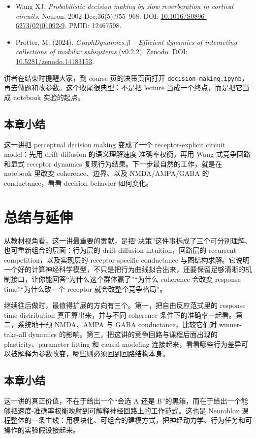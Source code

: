 \documentclass[a4paper]{article}
\begin{document}
\begin{itemize}
    \item Wang XJ. \emph{Probabilistic decision making by slow reverberation in cortical circuits}. Neuron. 2002 Dec;36(5):955--968. DOI: \href{https://doi.org/10.1016/S0896-6273(02)01092-9}{10.1016/S0896-6273(02)01092-9}. PMID: 12467598.
    \item Protter, M. (2024). \emph{GraphDynamics.jl -- Efficient dynamics of interacting collections of modular subsystems} (v0.2.2). Zenodo. DOI: \href{https://doi.org/10.5281/zenodo.14183153}{10.5281/zenodo.14183153}.
\end{itemize}

讲者在结束时提醒大家，到 course 页的决策页面打开 \texttt{decision\_making.ipynb}，再去做题和改参数。这个收尾很典型：不是把 lecture 当成一个终点，而是把它当成 notebook 实验的起点。

\subsection{本章小结}
这一讲把 perceptual decision making 变成了一个 receptor-explicit circuit model：先用 drift-diffusion 的语义理解速度-准确率权衡，再用 Wang 式竞争回路和显式 receptor dynamics 复现行为结果。下一步最自然的工作，就是在 notebook 里改变 coherence、边界、以及 NMDA/AMPA/GABA 的 conductance，看看 decision behavior 如何变化。

\section{总结与延伸}
从教材视角看，这一讲最重要的贡献，是把“决策”这件事拆成了三个可分别理解、也可重新组合的层面：行为层的 drift-diffusion intuition，回路层的 recurrent competition，以及实现层的 receptor-specific conductance 与图结构求解。它说明一个好的计算神经科学模型，不只是把行为曲线拟合出来，还要保留足够清晰的机制接口，让你能回答“为什么这个群体赢了”“为什么 coherence 会改变 response time”“为什么改一个 receptor 就会改整个竞争格局”。

继续往后做时，最值得扩展的方向有三个。第一，把自由反应范式里的 response time distribution 真正算出来，并与不同 coherence 条件下的准确率一起看。第二，系统地干预 NMDA、AMPA 与 GABA conductance，比较它们对 winner-take-all dynamics 的影响。第三，把这讲的竞争回路与课程后面出现的 plasticity、parameter fitting 和 causal modeling 连接起来，看看哪些行为差异可以被解释为参数改变，哪些则必须回到回路结构本身。

\subsection{本章小结}
这一讲的真正价值，不在于给出一个“会选 A 还是 B”的黑箱，而在于给出一个能够把速度-准确率权衡映射到可解释神经回路上的工作范式。这也是 Neuroblox 课程整体的一条主线：用模块化、可组合的建模方式，把神经动力学、行为任务和可操作的实验假设接起来。
\end{document}

